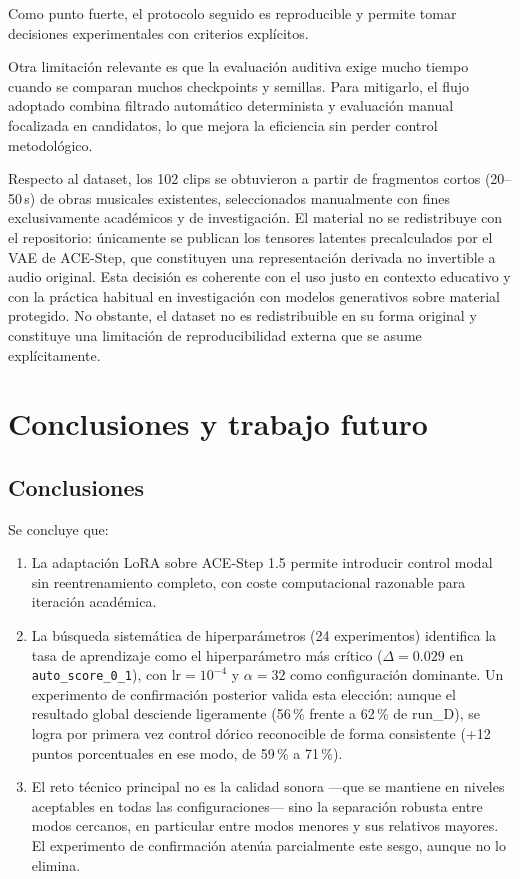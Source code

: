 \documentclass[%
    school=etsisi,%
    type=pfg,%
    degree=61CD,%
]{upm-report}
\begin{document}
Como punto fuerte, el protocolo seguido es reproducible y permite tomar decisiones experimentales con criterios expl\'icitos.

Otra limitaci\'on relevante es que la evaluaci\'on auditiva exige mucho tiempo cuando se comparan muchos checkpoints y semillas. Para mitigarlo, el flujo adoptado combina filtrado autom\'atico determinista y evaluaci\'on manual focalizada en candidatos, lo que mejora la eficiencia sin perder control metodol\'ogico.

Respecto al dataset, los 102 clips se obtuvieron a partir de fragmentos cortos (20--50\,s) de obras musicales existentes, seleccionados manualmente con fines exclusivamente acad\'emicos y de investigaci\'on. El material no se redistribuye con el repositorio: \'unicamente se publican los tensores latentes precalculados por el VAE de ACE-Step, que constituyen una representaci\'on derivada no invertible a audio original. Esta decisi\'on es coherente con el uso justo en contexto educativo y con la pr\'actica habitual en investigaci\'on con modelos generativos sobre material protegido. No obstante, el dataset no es redistribuible en su forma original y constituye una limitaci\'on de reproducibilidad externa que se asume expl\'icitamente.

\chapter{Conclusiones y trabajo futuro}
\label{ch:conclusiones}

\section{Conclusiones}

Se concluye que:

\begin{enumerate}
    \item La adaptaci\'on LoRA sobre ACE-Step 1.5 permite introducir control modal sin reentrenamiento completo, con coste computacional razonable para iteraci\'on acad\'emica.
    \item La b\'usqueda sistem\'atica de hiperpar\'ametros (24 experimentos) identifica la tasa de aprendizaje como el hiperpar\'ametro m\'as cr\'itico ($\Delta = 0.029$ en \texttt{auto\_score\_0\_1}), con $\text{lr} = 10^{-4}$ y $\alpha = 32$ como configuraci\'on dominante. Un experimento de confirmaci\'on posterior valida esta elecci\'on: aunque el resultado global desciende ligeramente (56\,\% frente a 62\,\% de run\_D), se logra por primera vez control d\'orico reconocible de forma consistente (+12 puntos porcentuales en ese modo, de 59\,\% a 71\,\%).
    \item El reto t\'ecnico principal no es la calidad sonora ---que se mantiene en niveles aceptables en todas las configuraciones--- sino la separaci\'on robusta entre modos cercanos, en particular entre modos menores y sus relativos mayores. El experimento de confirmaci\'on aten\'ua parcialmente este sesgo, aunque no lo elimina.
\end{enumerate}
\end{document}
